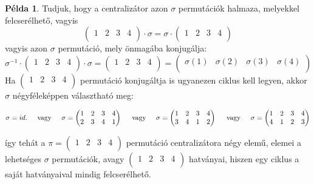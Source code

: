 \documentclass[12pt]{book}
\theoremstyle{plain} %
\theoremstyle{definition} %
\newtheorem{pl}{Példa}[section]
\theoremstyle{remark}
\numberwithin{equation}{section}  %
\begin{document}
\begin{pl}
		Tudjuk, hogy a centralizátor azon $\sigma$ permutációk halmaza, melyekkel felcserélhető, vagyis
		\[ \begin{pmatrix}
		1 & 2 & 3 & 4 \\
		\end{pmatrix} \cdot \sigma = 
		\sigma \cdot
		\begin{pmatrix}
		1 & 2 & 3 & 4 \\
		\end{pmatrix}  \]
		vagyis azon $\sigma$ permutáció, mely önmagába konjugálja:
		\[ \sigma^{-1} \cdot 
		\begin{pmatrix}
		1 & 2 & 3 & 4 \\
		\end{pmatrix}
		\cdot \sigma = 
		\begin{pmatrix}
		1 & 2 & 3 & 4 \\
		\end{pmatrix} =
		\begin{pmatrix}
		\sigma(1) & \sigma(2) & \sigma(3) & \sigma(4) \\
		\end{pmatrix} \]
		Ha $\begin{pmatrix}
		1 & 2 & 3 & 4 \\
		\end{pmatrix}$ permutáció konjugáltja is ugyanezen ciklus kell legyen, akkor $\sigma$ négyféleképpen választható meg:
		\begin{small}
		\[ \sigma = 
		id. \hspace{5mm} \text{vagy} \hspace{5mm} \sigma = 
		\begin{pmatrix}
		1 & 2 & 3 & 4 \\
		2 & 3 & 4 & 1 \\
		\end{pmatrix} \hspace{5mm} \text{vagy} \hspace{5mm} \sigma = 
		\begin{pmatrix}
		1 & 2 & 3 & 4 \\
		3 & 4 & 1 & 2 \\
		\end{pmatrix}
		\hspace{5mm} \text{vagy} \hspace{5mm} \sigma = 
		\begin{pmatrix}
		1 & 2 & 3 & 4 \\
		4 & 1 & 2 & 3 \\
		\end{pmatrix} \]
		\end{small}
	    így tehát a $\pi = 
		\begin{pmatrix}
		1 & 2 & 3 & 4 \\
		\end{pmatrix}$ permutáció centralizátora négy elemű, elemei a lehetséges $\sigma$ permutációk, avagy $
		\begin{pmatrix}
		1 & 2 & 3 & 4 \\
		\end{pmatrix}$ hatványai, hiszen egy ciklus a saját hatványaival mindig felcserélhető.
		

\end{pl}
\end{document}
